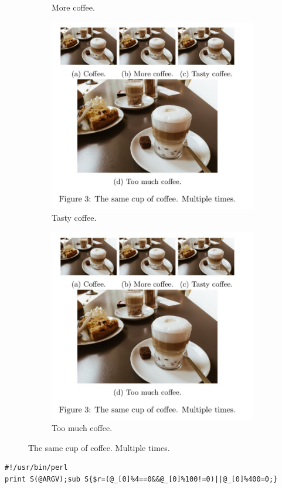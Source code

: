 \documentclass{article}
\begin{document}
\begin{figure}[h!]
\begin{subfigure}[b]{0.2\linewidth}
    \caption{More coffee.}
  \end{subfigure}
  \begin{subfigure}[b]{0.2\linewidth}
    \includegraphics[width=\linewidth]{coffee.jpg}
    \caption{Tasty coffee.}
  \end{subfigure}
  \begin{subfigure}[b]{0.5\linewidth}
    \includegraphics[width=\linewidth]{coffee.jpg}
    \caption{Too much coffee.}
  \end{subfigure}
  \caption{The same cup of coffee. Multiple times.}
  \label{fig:coffee3}
 
\end{figure}

\begin{lstlisting}
#!/usr/bin/perl
print S(@ARGV);sub S{$r=(@_[0]%4==0&&@_[0]%100!=0)||@_[0]%400=0;}
\end{lstlisting}

\newpage



\end{document}
